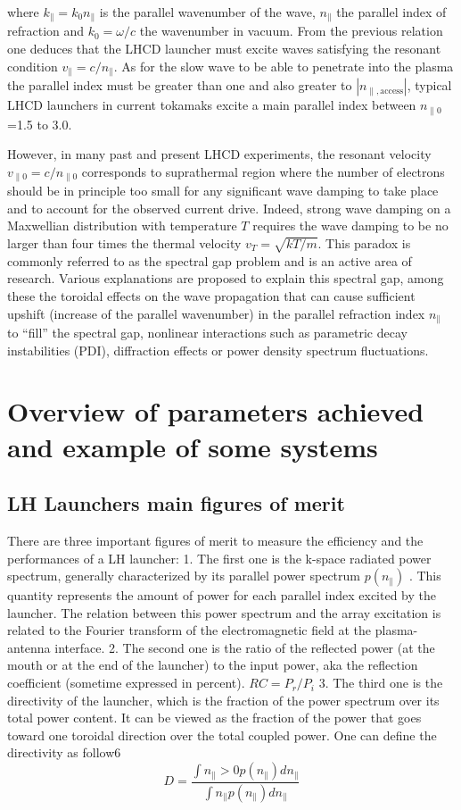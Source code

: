 where $k_{\parallel}=k_0 n_{\parallel}$ is the parallel wavenumber of the wave, $n_{\parallel}$ the parallel index of refraction and $k_0= \omega/c$ the wavenumber in vacuum. From the previous relation one deduces that the LHCD launcher must excite waves satisfying the resonant condition $v_{\parallel}=c/n_{\parallel}$. As for the slow wave to be able to penetrate into the plasma the parallel index must be greater than one and also greater to $|n_{\parallel, \mathrm{access}}|$, typical LHCD launchers in current tokamaks excite a main parallel index between $n_{\parallel 0}$=1.5 to 3.0. 

However, in many past and present LHCD experiments, the resonant velocity $v_{\parallel 0}=c/n_{\parallel 0}$ corresponds to suprathermal region where the number of electrons should be in principle too small for any significant wave damping to take place and to account for the observed current drive. Indeed, strong wave damping on a Maxwellian distribution with temperature $T$ requires the wave damping to be no larger than four times the thermal velocity $v_T=\sqrt{k T/m}$. This paradox is commonly referred to as the spectral gap problem and is an active area of research. Various explanations are proposed to explain this spectral gap, among these the toroidal effects on the wave propagation that can cause sufficient upshift (increase of the parallel wavenumber) in the parallel refraction index $n_{\parallel}$ to “fill” the spectral gap, nonlinear interactions such as parametric decay instabilities (PDI), diffraction effects or power density spectrum fluctuations. 


\section{Overview of parameters achieved and example of some systems}
\subsection{LH Launchers main figures of merit}

There are three important figures of merit to measure the efficiency and the performances of a LH launcher: 
1. The first one is the k-space radiated power spectrum, generally characterized by its parallel power spectrum $p(n_{\parallel})$ . This quantity represents the amount of power for each parallel index excited by the launcher. The relation between this power spectrum and the array excitation is related to the Fourier transform of the electromagnetic field at the plasma-antenna interface. 
2. The second one is the ratio of the reflected power (at the mouth or at the end of the launcher) to the input power, aka the reflection coefficient (sometime expressed in percent). 
$RC = P_r/P_i$
3. The third one is the directivity of the launcher, which is the fraction of the power spectrum over its total power content. It can be viewed as the fraction of the power that goes toward one toroidal direction over the total coupled power. One can define the directivity as follow6
$$D= \frac{\int n_{\parallel} >0 p(n_{\parallel}) dn_{\parallel} }{\int n_{\parallel} p(n_{\parallel}) dn_{\parallel} } $$

